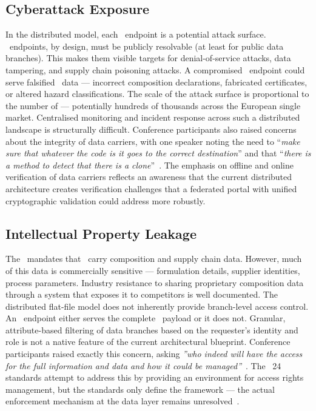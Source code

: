 \subsection{Cyberattack Exposure}

In the distributed model, each \REO\ endpoint is a potential attack surface.
\DPP\ endpoints, by design, must be publicly resolvable (at least for public
data branches). This makes them visible targets for denial-of-service attacks,
data tampering, and supply chain poisoning attacks. A compromised \REO\ endpoint
could serve falsified \DPP\ data --- incorrect composition declarations,
fabricated certificates, or altered hazard classifications. The scale of the
attack surface is proportional to the number of \REOs --- potentially hundreds
of thousands across the European single market. Centralised monitoring and
incident response across such a distributed landscape is structurally difficult.
Conference participants also raised concerns about the integrity of data
carriers, with one speaker noting the need to ``\textit{make sure that whatever
the code is it goes to the correct destination}'' and that ``\textit{there is a
method to detect that there is a clone}''~\cite{conf_phishing}. The emphasis on
offline and online verification of data carriers reflects an awareness that the
current distributed architecture creates verification challenges that a
federated portal with unified cryptographic validation could address more
robustly.

\subsection{Intellectual Property Leakage}

The \ESPR\ mandates that \DPPs\ carry composition and supply chain data.
However, much of this data is commercially sensitive --- formulation details,
supplier identities, process parameters. Industry resistance to sharing
proprietary composition data through a system that exposes it to competitors is
well documented. The distributed flat-file model does not inherently provide
branch-level access control. An \REO\ endpoint either serves the complete \DPP\
payload or it does not. Granular, attribute-based filtering of data branches
based on the requester's identity and role is not a native feature of the
current architectural blueprint. Conference participants raised exactly this
concern, asking \textit{''who indeed will have the access for the full
information and data and how it could be
managed''}~\cite{conf_access_management}. The \JTC~24 standards attempt to
address this by providing an environment for access rights management, but the
standards only define the framework --- the actual enforcement mechanism at the
data layer remains unresolved~\cite{conf_jtc24_access}.

